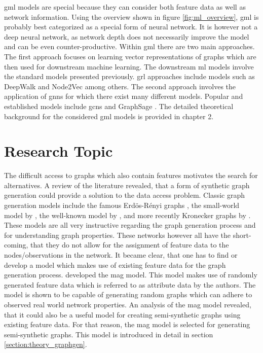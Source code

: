 	\noindent \acs{gml} models are special because they can 
	consider both feature data as well as network information. Using the
	overview shown in figure \ref{fig:ml_overview}, \acs{gml} is probably best 
	categorized as a special form of neural network. It is however not a deep 
	neural network, as network depth does not necessarily improve the model and 
	can be even counter-productive. Within \acs{gml} there are two main 
	approaches. The first approach focuses on learning vector representations of 
	graphs which are then used for downstream machine learning. The downstream 
	\acs{ml} models involve the standard models presented previously. 
	\Ac{grl} approaches include models such as DeepWalk 
	\citep{perozzi2014deepwalk} and Node2Vec \citep{grover2016node2vec} among 
	others. The second approach involves the application of \acp{gnn} for which 
	there exist many different models. Popular and established models include 
	\acp{gcn} \citep{kipf2016semi} and GraphSage \citep{hamilton2017inductive}. 
	The detailed theoretical background for the considered \acs{gml} models is 
	provided in chapter 2.

	\section{Research Topic}
	\label{section:research_topics}

	\noindent The difficult access to graphs which also contain features 
	motivates the search for alternatives. A review of the literature revealed, 
	that a form of synthetic graph generation could provide a solution to the data 
	access problem. Classic graph generation models include the famous 
	Erdös-Rényi graphs \citeyearpar{erdos1959random}, the small-world model by 
	\cite{watts1998collective}, the well-known model by 
	\cite{barabasi1999emergence}, and more recently Kronecker graphs by
	\cite{leskovec2010kronecker}. These models are all very instructive
	regarding the graph generation process and for understanding graph
	properties. These networks however all have the short-coming, that they do 
	not allow for the assignment of feature data to the nodes/observations in the
	network. It became clear, that one has to find or develop a model which 
	makes use of existing feature data for the graph generation process. 
	\cite{kim2012multiplicative} developed the \ac{mag} model. This model makes 
	use of randomly generated feature data which is referred to as attribute data 
	by the authors. The model is shown to be capable of generating random graphs 
	which can adhere to observed real world network properties. An analysis of 
	the \ac{mag} model revealed, that it could also be a useful model for 
	creating semi-synthetic graphs using existing feature data. For that reason, 
	the \acs{mag} model is selected for generating semi-synthetic graphs. This 
	model is introduced in detail in section \ref{section:theory_graphgen}. \\

